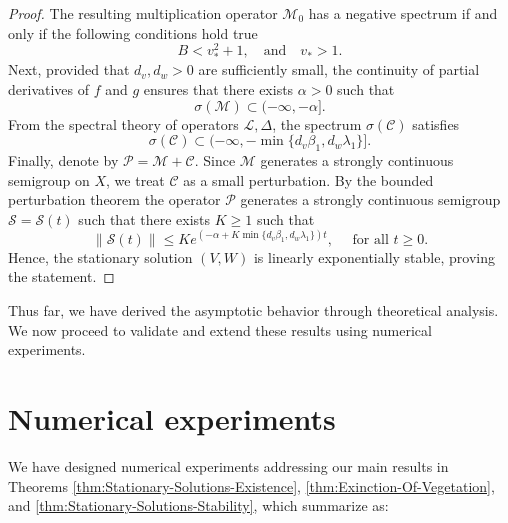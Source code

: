 \documentclass[11pt, a4paper]{article}
\theoremstyle{break}
\theoremstyle{break}
\theoremstyle{break}
\theoremstyle{break}
\theoremstyle{break}
\theoremstyle{break}
\theoremstyle{break}
\theoremstyle{break}
\theoremstyle{break}
\begin{document}
\begin{proof}
    The resulting multiplication operator $\mathcal{M}_0$ has a negative spectrum if and only if the following conditions hold true
    \begin{equation}
        \label{eq:multiplicative_op_negative_spectrum_condition}
        B < v_*^2 + 1, 
        \quad
        \text{and}
        \quad
        v_* > 1.
    \end{equation}
    Next, provided that $d_v, d_w > 0$ are sufficiently small, the continuity of partial derivatives of $f$ and $g$ ensures that there exists  $\alpha > 0$ such that
    \begin{equation}
        \label{eq:spectrum_of_multiplication_operator}
        \sigma
        \left(
        \mathcal{M}
        \right)
        \subset
        (-\infty, -\alpha].
    \end{equation}
    From the spectral theory of operators $\mathcal{L}, \Delta$, the spectrum $\sigma(\mathcal{C})$ satisfies
    \begin{equation}
        \label{eq:spectrum_of_diffusion_operator}
        \sigma
        \left(
        \mathcal{C}
        \right)
        \subset
        (-\infty, -\min\{d_v\beta_1, d_w\lambda_1\}].
    \end{equation}  
    Finally, denote by $\mathcal{P} = \mathcal{M} + \mathcal{C}$. Since $\mathcal{M}$ generates a strongly continuous semigroup on $X$, we treat $\mathcal{C}$ as a small perturbation. By the bounded perturbation theorem \cite[Theorem 1.3]{EngelNagel2000} the operator $\mathcal{P}$ generates a strongly continuous semigroup $\mathcal{S}=\mathcal{S}(t)$ such that there exists $K \geq 1$ such that
    \begin{equation}
        \|\mathcal{S}(t)\|
        \leq
        K e^{\left(-\alpha + K \min\{d_v \beta_1, d_w \lambda_1\} \right)t}, 
        \quad
        \text{ for all }
        t \geq 0.
    \end{equation}
    Hence, the stationary solution $(V,W)$ is linearly exponentially stable, proving the statement.
\end{proof}

Thus far, we have derived the asymptotic behavior through theoretical analysis. We now proceed to validate and extend these results using numerical experiments.

\section{Numerical experiments}
We have designed numerical experiments addressing our main results in Theorems \ref{thm:Stationary-Solutions-Existence}, \ref{thm:Exinction-Of-Vegetation}, and \ref{thm:Stationary-Solutions-Stability}, which summarize as: \\
\end{document}
